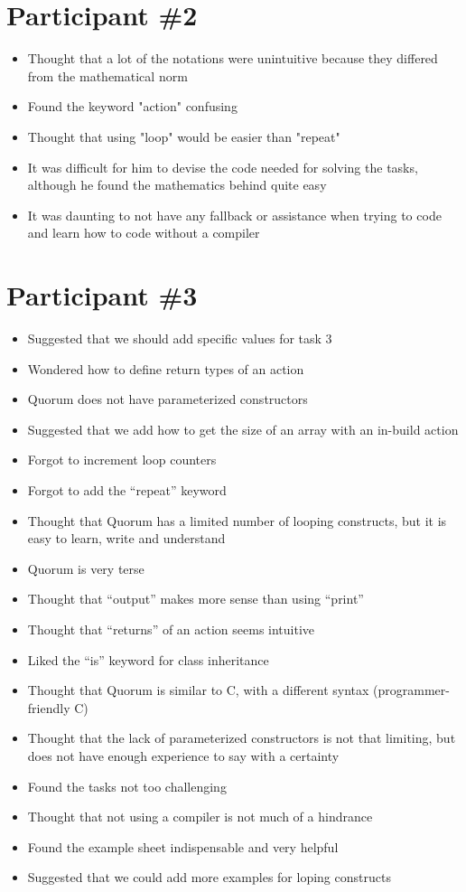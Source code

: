 \section{Participant {\#}2}
\begin{itemize}
\item Thought that a lot of the notations were unintuitive because they differed from the mathematical norm
\item Found the keyword "action" confusing 
\item Thought that using "loop" would be easier than "repeat"
\item It was difficult for him to devise the code needed for solving the tasks, although he found the mathematics behind quite easy
\item It was daunting to not have any fallback or assistance when trying to code and learn how to code without a compiler
\end{itemize}
\section{Participant {\#}3}
\begin{itemize}
\item Suggested that we should add specific values for task 3
\item Wondered how to define return types of an action
\item Quorum does not have parameterized constructors
\item Suggested that we add how to get the size of an array with an in-build action
\item Forgot to increment loop counters
\item Forgot to add the “repeat” keyword
\item Thought that Quorum has a limited number of looping constructs, but it is easy to learn, write and understand
\item Quorum is very terse
\item Thought that “output” makes more sense than using “print”
\item Thought that “returns” of an action seems intuitive
\item Liked the “is” keyword for class inheritance
\item Thought that Quorum is similar to C, with a different syntax (programmer-friendly C) 
\item Thought that the lack of parameterized constructors is not that limiting, but does not have enough experience to say with a certainty
\item Found the tasks not too challenging 
\item Thought that not using a compiler is not much of a hindrance
\item Found the example sheet indispensable and very helpful
\item Suggested that we could add more examples for loping constructs
\end{itemize}
